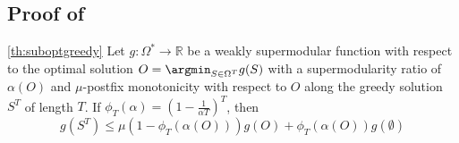 \documentclass{article}
\begin{document}
\subsection{Proof of } \label{sec:proofsuboptgreedy}



\begin{customtheorem}{\ref{th:suboptgreedy}}
    Let $g: \Omega^* \to \mathbb{R}$ be a weakly supermodular function with respect to the optimal solution $O = \argmin_{S \in \Omega^T} g(S)$ with a supermodularity ratio of $\alpha(O)$ and 
    $\mu$-postfix monotonicity with respect to $O$ along the greedy solution $S^T$ of length $T$. If $\phi_T(\alpha) =  \left(1 - \frac{1}{\alpha T}\right)^T$, then
    \begin{equation*}
        g(S^T) \leq  \mu\left(1 - \phi_T(\alpha(O))\right)
        g(O) +  \phi_T(\alpha(O))g(\emptyset)
    \end{equation*}
\end{customtheorem}
\end{document}
